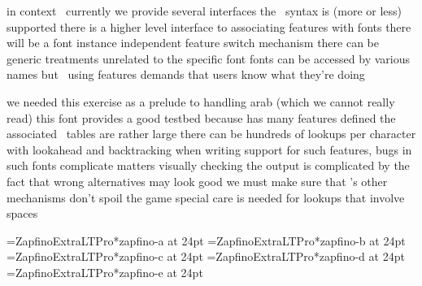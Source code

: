 \StopSteps

\StopTopic


\StartSteps

\StartItem in context \MKIV\ currently we provide several interfaces \FlushStep \StopItem
\StartItem the \XETEX\ syntax is (more or less) supported \FlushStep \StopItem
\StartItem there is a higher level interface to associating features with fonts  \FlushStep \StopItem
\StartItem there will be a font instance independent feature switch mechanism \FlushStep \StopItem
\StartItem there can be generic treatments unrelated to the specific font \FlushStep \StopItem
\StartItem fonts can be accessed by various names \FlushStep \StopItem
\StartItem but \unknown\ using features demands that users know what they're doing \FlushStep \StopItem

\StopSteps

\StopTopic


\StartSteps

\StartItem we needed this exercise as a prelude to handling arab (which we cannot really read) \FlushStep \StopItem
\StartItem this font provides a good testbed because has many features defined \FlushStep \StopItem
\StartItem the associated \LUATEX\ tables are rather large \FlushStep \StopItem
\StartItem there can be hundreds of lookups per character with lookahead and backtracking \FlushStep \StopItem
\StartItem when writing support for such features, bugs in such fonts complicate matters \FlushStep \StopItem
\StartItem visually checking the output is complicated by the fact that wrong alternatives may look good \FlushStep \StopItem
\StartItem we must make sure that \TEX's other mechanisms don't spoil the game \FlushStep \StopItem
\StartItem special care is needed for lookups that involve spaces \FlushStep \StopItem

\StopSteps

\page \start


\font\testa=ZapfinoExtraLTPro*zapfino-a at 24pt
\font\testb=ZapfinoExtraLTPro*zapfino-b at 24pt
\font\testc=ZapfinoExtraLTPro*zapfino-c at 24pt
\font\testd=ZapfinoExtraLTPro*zapfino-d at 24pt
\font\teste=ZapfinoExtraLTPro*zapfino-e at 24pt


